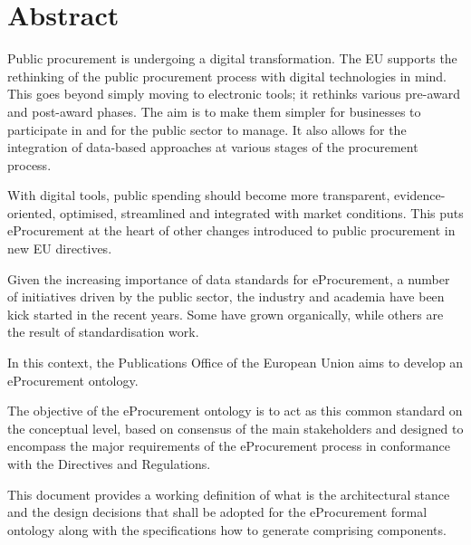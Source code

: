 \section*{Abstract}
	Public procurement is undergoing a digital transformation. The EU supports the rethinking of the public procurement process with digital technologies in mind. This goes beyond simply moving to electronic tools; it rethinks various pre-award and post-award phases. The aim is to make them simpler for businesses to participate in and for the public sector to manage. It also allows for the integration of data-based approaches at various stages of the procurement process.
	
	With digital tools, public spending should become more transparent, evidence-oriented, optimised, streamlined and integrated with market conditions. This puts eProcurement at the heart of other changes introduced to public procurement in new EU directives.
	
	Given the increasing importance of data standards for eProcurement, a number of initiatives driven by the public sector, the industry and academia have been kick started	in the recent years. Some have grown organically, while others are the result of	standardisation work.
	
	In this context, the Publications Office of the European Union aims to develop an eProcurement ontology.
	
	The objective of the eProcurement ontology is to act as this common standard on the	conceptual level, based on consensus of the main stakeholders and designed to encompass the major requirements of the eProcurement process in conformance with the Directives and Regulations.
	
	This document provides a working definition of what is the architectural stance and the design decisions that shall be adopted for the eProcurement formal ontology along with the specifications how to generate comprising components. 